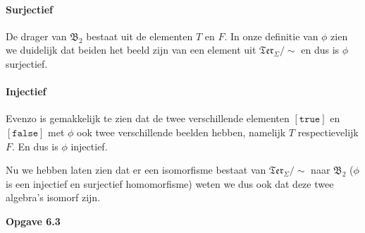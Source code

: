 \documentclass[a4paper,11pt]{article}
\begin{document}
\begin{enumerate}
\paragraph{Surjectief}

De drager van $\mathfrak{B}_{2}$ bestaat uit de elementen $T$ en $F$. In onze
definitie van $\phi$ zien we duidelijk dat beiden het beeld zijn van een
element uit $\mathfrak{Ter}_{\Sigma}/\sim$ en dus is $\phi$ surjectief.

\paragraph{Injectief}

Evenzo is gemakkelijk te zien dat de twee verschillende elementen
$[\texttt{true}]$ en $[\texttt{false}]$ met $\phi$ ook twee verschillende
beelden hebben, namelijk $T$ respectievelijk $F$. En dus is $\phi$ injectief.

Nu we hebben laten zien dat er een isomorfisme bestaat van
$\mathfrak{Ter}_{\Sigma}/\sim$ naar $\mathfrak{B}_{2}$ ($\phi$ is een
injectief en surjectief homomorfisme) weten we dus ook dat deze twee algebra's
isomorf zijn.\\[2em]

\end{enumerate}


{\bf Opgave 6.3}
\end{document}
